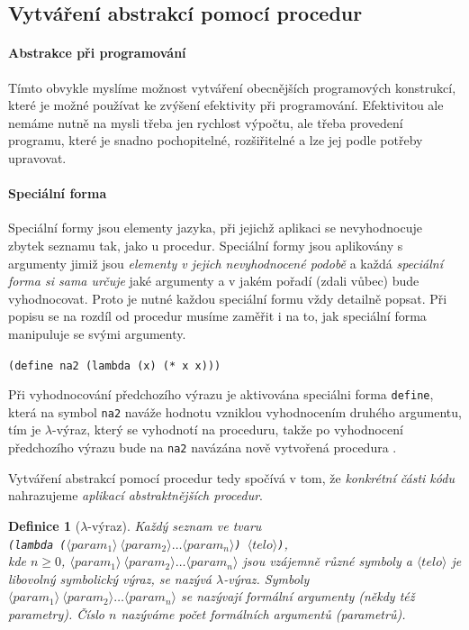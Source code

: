 \documentclass[10pt,a4paper]{article}
\newtheorem{definition}{Definice}
\begin{document}
  \subsection{Vytváření abstrakcí pomocí procedur}
    \paragraph{Abstrakce při programování} Tímto obvykle myslíme možnost vytváření obecnějších programových konstrukcí, které je možné používat ke zvýšení efektivity při programování. Efektivitou ale nemáme nutně na mysli třeba jen rychlost výpočtu, ale třeba provedení programu, které je snadno pochopitelné, rozšiřitelné a lze jej podle potřeby upravovat.

    \paragraph{Speciální forma} Speciální formy jsou elementy jazyka, při jejichž aplikaci se nevyhodnocuje zbytek seznamu tak, jako u procedur. Speciální formy jsou aplikovány s argumenty jimiž jsou \textit{elementy v jejich nevyhodnocené podobě} a každá \textit{speciální forma si sama určuje} jaké argumenty a v jakém pořadí (zdali vůbec) bude vyhodnocovat. Proto je nutné každou speciální formu vždy detailně popsat. Při popisu se na rozdíl od procedur musíme zaměřit i na to, jak speciální forma manipuluje se svými argumenty.

    \hspace{4ex} \texttt{(define na2 (lambda (x) (* x x)))}

    Při vyhodnocování předchozího výrazu je aktivována speciálni forma \texttt{define}, která na symbol \texttt{na2} naváže hodnotu vzniklou vyhodnocením druhého argumentu, tím je $\lambda$-výraz, který se vyhodnotí na proceduru, takže po vyhodnocení předchozího výrazu bude na \texttt{na2} navázána nově vytvořená procedura .

    Vytváření abstrakcí pomocí procedur tedy spočívá v tom, že \textit{konkrétní části kódu} nahrazujeme \textit{aplikací abstraktnějších procedur}.

    \begin{definition}[$\lambda$-výraz]
      Každý seznam ve tvaru\\
      \texttt{(lambda ($\langle param_1 \rangle\ \langle param_2 \rangle\ldots\langle param_n \rangle$) $\langle telo \rangle$)},\\
      kde $n\geq0$, $\langle param_1 \rangle\ \langle param_2 \rangle\ldots\langle param_n \rangle$ jsou vzájemně různé symboly a $\langle telo \rangle$ je libovolný symbolický výraz, se nazývá \textit{$\lambda$-výraz}. Symboly $\langle param_1 \rangle\ \langle param_2 \rangle\ldots\langle param_n \rangle$ se nazývají \textit{formální argumenty} (někdy též \textit{parametry}). Číslo $n$ nazýváme \textit{počet formálních argumentů} (\textit{parametrů}).
    \end{definition}
\end{document}
